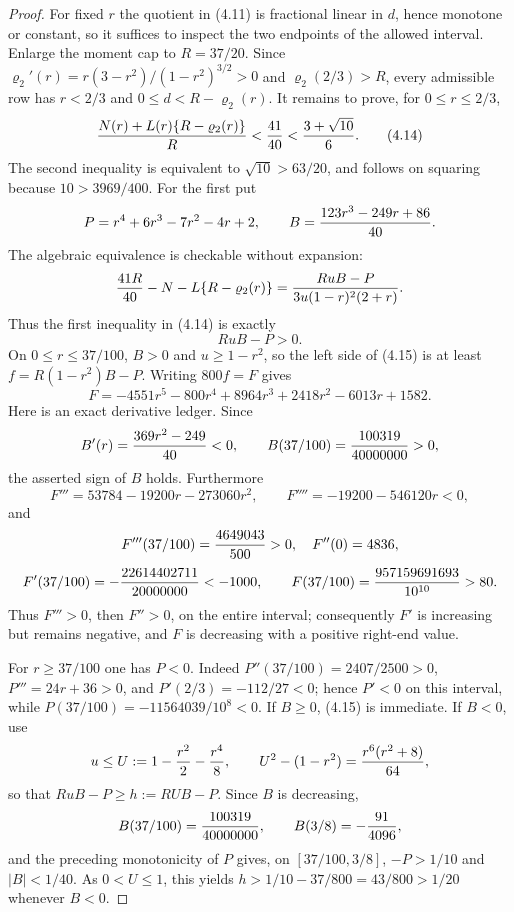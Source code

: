 \documentclass[11pt,a4paper]{article}
\numberwithin{equation}{section}
\theoremstyle{definition}
\theoremstyle{remark}
\begin{document}
\begin{proof}
For fixed $r$ the quotient in (4.11) is fractional linear in $d$, hence
monotone or constant, so it suffices to inspect the two endpoints of the
allowed interval.  Enlarge the moment cap to $R=37/20$.  Since
$\varrho_2'(r)=r(3-r^2)/(1-r^2)^{3/2}>0$ and
$\varrho_2(2/3)>R$, every admissible row has $r<2/3$ and
$0\le d<R-\varrho_2(r)$.  It remains to prove, for $0\le r\le2/3$,
\[
 {N(r)+L(r)\{R-\varrho_2(r)\}\over R}<{41\over40}
 <{3+\sqrt {10}\over6}.                                \tag{4.14}
\]
The second inequality is equivalent to $\sqrt {10}>63/20$, and follows on
squaring because $10>3969/400$.  For the first put
\[
 P=r^4+6r^3-7r^2-4r+2,\qquad
 B={123r^3-249r+86\over40}.
\]
The algebraic equivalence is checkable without expansion:
\[
 {41R\over40}-N-L\{R-\varrho_2(r)\}
 ={RuB-P\over3u(1-r)^2(2+r)}.
\]
Thus the first inequality in (4.14) is exactly
\[
                         RuB-P>0.                       \tag{4.15}
\]
On $0\le r\le37/100$, $B>0$ and $u\ge1-r^2$, so the left side of
(4.15) is at least $f=R(1-r^2)B-P$.  Writing $800f=F$ gives
\[
 F=-4551r^5-800r^4+8964r^3+2418r^2-6013r+1582.
\]
Here is an exact derivative ledger.  Since
\[
 B'(r)={369r^2-249\over40}<0,\qquad
 B(37/100)={100319\over40000000}>0,
\]
the asserted sign of $B$ holds.  Furthermore
\[
 F'''=53784-19200r-273060r^2,\qquad
 F''''=-19200-546120r<0,
\]
and
\[
 F'''(37/100)={4649043\over500}>0,\quad F''(0)=4836,
\]
\[
 F'(37/100)=-{22614402711\over20000000}<-1000,\qquad
 F(37/100)={957159691693\over10^{10}}>80.
\]
Thus $F'''>0$, then $F''>0$, on the entire interval; consequently $F'$ is
increasing but remains negative, and $F$ is decreasing with a positive
right-end value.

For $r\ge37/100$ one has $P<0$.  Indeed
$P''(37/100)=2407/2500>0$, $P'''=24r+36>0$, and
$P'(2/3)=-112/27<0$; hence $P'<0$ on this interval, while
$P(37/100)=-11564039/10^8<0$.  If $B\ge0$, (4.15) is immediate.  If
$B<0$, use
\[
 u\le U:=1-{r^2\over2}-{r^4\over8},\qquad
 U^2-(1-r^2)={r^6(r^2+8)\over64},
\]
so that $RuB-P\ge h:=RUB-P$.  Since $B$ is decreasing,
\[
 B(37/100)={100319\over40000000},\qquad B(3/8)=-{91\over4096},
\]
and the preceding monotonicity of $P$ gives, on $[37/100,3/8]$,
$-P>1/10$ and $|B|<1/40$.  As $0<U\le1$, this yields
$h>1/10-37/800=43/800>1/20$ whenever $B<0$.


\end{proof}
\end{document}
